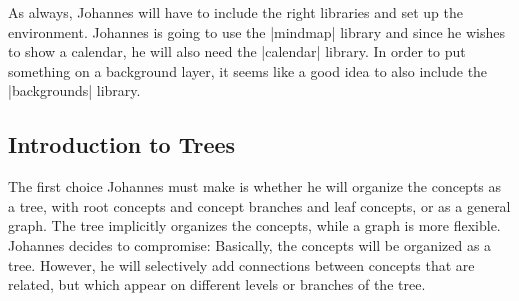 As always, Johannes will have to include the right libraries and set up the
environment. Johannes is going to use the |mindmap| library and since he wishes
to show a calendar, he will also need the |calendar| library. In order to put
something on a background layer, it seems like a good idea to also include the
|backgrounds| library.


\subsection{Introduction to Trees}

The first choice Johannes must make is whether he will organize the concepts as
a tree, with root concepts and concept branches and leaf concepts, or as a
general graph. The tree implicitly organizes the concepts, while a graph is
more flexible. Johannes decides to compromise: Basically, the concepts will be
organized as a tree. However, he will selectively add connections between
concepts that are related, but which appear on different levels or branches of
the tree.

